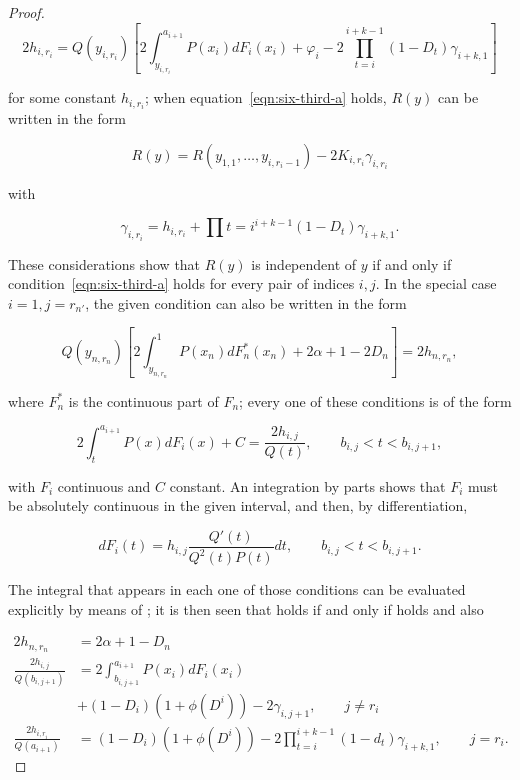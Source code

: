 \documentclass{article}
\begin{document}
\begin{proof}
\begin{equation}
 2h_{i,r_i} = Q(y_{i,r_i}) \left [ 2 \int_{y_{i,r_i}}^{a_{i+1}} P(x_i) dF_i(x_i)
+ \varphi_i - 2 \prod_{t=i}^{i+k-1} (1-D_t) \gamma_{i+k, 1} \right ] \label{eqn:six-third-a}
\end{equation}

for some constant $h_{i,r_i}$; when equation~\ref{eqn:six-third-a} holds, $R(y)$
can be written in the form

\begin{equation}
R(y) = R(y_{1,1}, \dots, y_{i, r_i - 1}) - 2K_{i, r_i} \gamma_{i, r_i}
\label{eqn:six-third-b}
\end{equation}

with

\begin{equation}
\gamma_{i, r_i} = h_{i, r_i} + \prod{t=i}^{i+k-1} (1-D_t) \gamma_{i+k, 1}.
\label{eqn:six-three}
\end{equation}

These considerations show that $R(y)$ is independent of $y$ if and only if
condition~\ref{eqn:six-third-a} holds for every pair of indices $i, j$.  In the
special case $i=1, j=r_{n'}$, the given condition can also be written in the
form

\[
Q(y_{n,r_n}) \left [ 2 \int_{y_{n,r_n}}^{1} P(x_n) dF_n^*(x_n)
+ 2 \alpha + 1 - 2 D_n \right ] = 2h_{n,r_n},
\]

where $F_n^*$ is the continuous part of $F_n$; every one of these conditions is
of the form

\[
2 \int_{t}^{a_{i+1}} P(x) dF_i(x) + C = \frac{2h_{i, j}}{Q(t)},
\qquad b_{i,j} < t < b_{i, j+1},
\]

with $F_i$ continuous and $C$ constant. An integration by parts shows that
$F_i$ must be absolutely continuous in the given interval, and then, by
differentiation,

\begin{equation}
dF_i(t) = h_{i,j} \frac{Q'(t)}{Q^2(t) P(t)} dt, \qquad b_{i,j} < t < b_{i, j+1}.
\label{eqn:six-third-c}
\end{equation}

The integral that appears in each one of those conditions
\label{eqn:six-third-a} can be evaluated explicitly by means of
\label{eqn:six-third-c}; it is then seen that \label{eqn:six-third-a} holds if
and only if \label{eqn:six-third-c} holds and also

\begin{equation}
\begin{split}
2h_{n, r_n} &= 2\alpha + 1 - D_n \\
\frac{2h_{i,j}}{Q(b_{i, j+1})} &= 2 \int_{b_{i, j+1}}^{a_{i+1}} P(x_i) dF_i(x_i) \\
&+ (1-D_i)(1 + \phi(D^i)) - 2 \gamma_{i, j+1}, \qquad j \neq r_i  \\
\frac{2h_{i,r_i}}{Q(a_{i+1})} &=
(1-D_i)(1 + \phi(D^i)) - 2 \prod_{t=i}^{i+k-1} (1-d_t) \gamma_{i+k, 1}, \qquad j
= r_i.
\end{split}
\label{eqn:six-d}
\end{equation}


\end{proof}
\end{document}
